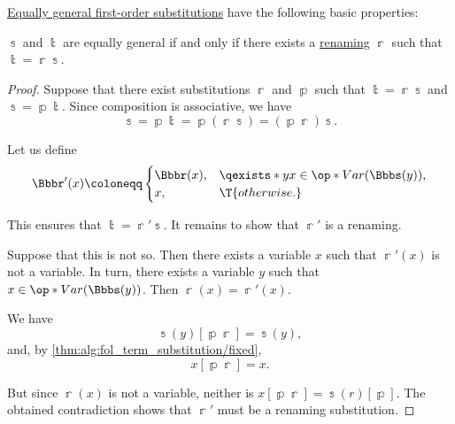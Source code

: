 \begin{proposition}\label{thm:def:fol_substitution_equivalence}
  \hyperref[def:fol_idempotent_substitution]{Equally general first-order substitutions} have the following basic properties:
  \begin{thmenum}
     \( \Bbbs \) and \( \Bbbt \) are equally general if and only if there exists a \hyperref[def:fol_renaming_substitution]{renaming} \( \Bbbr \) such that \( \Bbbt = \Bbbr\Bbbs \).
  \end{thmenum}
\end{proposition}
\begin{proof}
  \SufficiencySubProof* Suppose that there exist substitutions \( \Bbbr \) and \( \Bbbp \) such that \( \Bbbt = \Bbbr\Bbbs \) and \( \Bbbs = \Bbbp\Bbbt \). Since composition is associative, we have
  \begin{equation*}
    \Bbbs = \Bbbp\Bbbt = \Bbbp(\Bbbr\Bbbs) = (\Bbbp\Bbbr)\Bbbs.
  \end{equation*}

  Let us define
  \begin{equation*}
    \Bbbr'(x) \coloneqq \begin{cases}
      \Bbbr(x), &\qexists* y x \in \op*{Var}(\Bbbs(y)), \\
      x,        &\T{otherwise.}
    \end{cases}
  \end{equation*}

  This ensures that \( \Bbbt = \Bbbr' \Bbbs \). It remains to show that \( \Bbbr' \) is a renaming.

  Suppose that this is not so. Then there exists a variable \( x \) such that \( \Bbbr'(x) \) is not a variable. In turn, there exists a variable \( y \) such that \( x \in \op*{Var}(\Bbbs(y)) \). Then \( \Bbbr(x) = \Bbbr'(x) \).

  We have
  \begin{equation*}
    \Bbbs(y)[\Bbbp\Bbbr] = \Bbbs(y),
  \end{equation*}
  and, by \cref{thm:alg:fol_term_substitution/fixed},
  \begin{equation*}
    x[\Bbbp\Bbbr] = x.
  \end{equation*}

  But since \( \Bbbr(x) \) is not a variable, neither is \( x[\Bbbp\Bbbr] = \Bbbs(r)[\Bbbp] \). The obtained contradiction shows that \( \Bbbr' \) must be a renaming substitution.


\end{proof}
